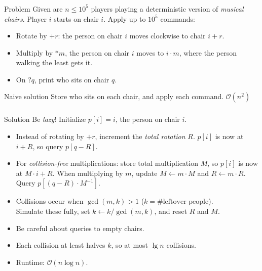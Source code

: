\begin{frame}
    \frametitle{\problemtitle}
    \begin{block}{Problem}
      Given are $n\leq 10^5$ players playing a deterministic version of \emph{musical
      chairs}.
      Player $i$ starts on chair $i$.
      Apply up to $10^5$ commands:
      \begin{itemize}
      \item Rotate by $+r$: the person on chair $i$ moves clockwise to chair $i+r$.
      \item Multiply by $* m$, the person on chair $i$ moves to $i\cdot m$, where
        the person walking the least gets it.
      \item On $? q$, print who sits on chair $q$.
      \end{itemize}
    \end{block}
    \pause
    \begin{block}{Naive solution}
      Store who sits on each chair, and apply each command. $\mathcal O(n^2)$
    \end{block}
\end{frame}

\begin{frame}
    \frametitle{\problemtitle}
    \begin{block}{Solution}
      Be \emph{lazy}!
      Initialize $p[i]=i$, the person on chair $i$.
      \begin{itemize}
        \item<+-> Instead of rotating by $+r$, increment the \emph{total rotation}
          $R$. $p[i]$ is now at $i+R$, so query $p[q-R]$.
        \item<+-> For \emph{collision-free} multiplications: store total
          multiplication $M$, so $p[i]$ is now at $M\cdot i + R$.
          When multiplying by $m$, update $M \leftarrow m\cdot M$ and $R\leftarrow m\cdot R$.
          Query $p[(q-R)\cdot M^{-1}]$.
        \item<+-> Collisions occur when $\gcd(m, k)>1$ ($k=\#\text{leftover
          people}$).\\
          Simulate these fully, set $k\leftarrow k/\gcd(m,k)$, and reset $R$ and $M$.
        \item<+-> Be careful about queries to empty chairs.
        \item<+-> Each collision at least halves $k$, so at most $\lg n$ collisions.
        \item<+-> Runtime: $\mathcal O(n \log n)$.
      \end{itemize}
    \end{block}
    \solvestats
\end{frame}
